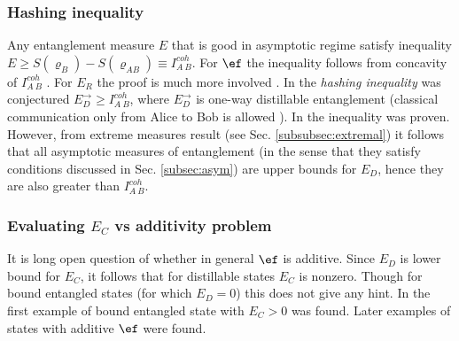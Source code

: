 \documentclass[rmp,12pt,preprint]{revtex4-2}
\begin{document}
\subsubsection{Hashing inequality}
\label{subsec:hasineq}
Any entanglement measure $E$ that is good in asymptotic regime satisfy inequality $E\geq S(\varrho_B)-S(\varrho_{AB})\equiv I^{coh}_{A\>B}$. For $\ef$ the
inequality follows from concavity of $I^{coh}_{A\>B}$ \cite{termo}. For
$E_R$ the proof is much more involved \cite{PlenioVP2000}. In
\cite{HHH-cap2000} the {\it hashing inequality} was conjectured
$E_D^\to\geq I^{coh}_{A\>B}$, where $E_D^\to$ is one-way distillable
entanglement (classical communication only from Alice to Bob is
allowed \cite{BDSW1996}). In
\cite{DevetakWinter-hash,DevetakWinter-hash-prl} the inequality was
proven. However, from extreme measures result (see Sec.
\ref{subsubsec:extremal}) it follows that all asymptotic measures of
entanglement (in the sense that they satisfy conditions discussed
in Sec. \ref{subsec:asym}) are upper bounds  for $E_D$, hence they are also greater than $I^{coh}_{A\>B}$.






\subsubsection{Evaluating $E_C$ vs additivity problem}
\label{subsubsec:cost-addit} It is long open question of whether in
general $\ef$ is additive. Since $E_D$ is lower bound for $E_C$, it
follows that for distillable states $E_C$ is nonzero. Though for
bound entangled states (for which $E_D=0$) this does not give any
hint. In \cite{VidalC-irre} the first example of bound
entangled state with $E_C>0$ was found. Later \cite{Vidal-cost2002}
examples of states with additive $\ef$ were found.
\end{document}
